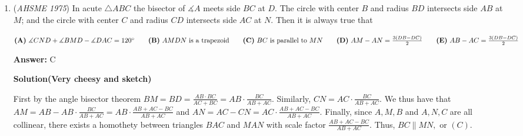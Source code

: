 \begin{enumerate}
 \textbf{Case 3:} Suppose the brother was the worst player and that him and the woman are twins. The woman and the best player are of opposite sex, so the best player would be the son. If the brother is the woman's twin (our initial assumption), then the son is not the same age as the brother, which means that the son is not the best player, and the brother is not the worst player.

 However, the woman and the brother do not necessarily have to be twins. For this case, we had to assume they were twins or else there was no way to continue the problem, since the brother would have no twin.

 \textbf{Case 4:} Suppose the son was the worst player. The daughter and the best player are of opposite sex, so the best player is the brother. The woman and her brother do not have to be twins. So it is, in fact, possible that the brother and the son are the same age.

 From this, we conclude our answer as $\boxed{\textbf{(B)}\ \text{her son}}$. ~\href{https://artofproblemsolving.com/wiki/index.php/User:Jiang147369}{jiang147369}

 


	\item (\textit{AHSME 1975}) In acute $\triangle ABC$ the bisector of $\measuredangle A$ meets side $BC$ at $D$. The circle with center $B$ and radius $BD$ 
intersects side $AB$ at $M$; and the circle with center $C$ and radius $CD$ intersects side $AC$ at $N$. Then it is always true that


 $\textbf{(A)}\ \measuredangle CND+\measuredangle BMD-\measuredangle DAC =120^{\circ} \qquad \textbf{(B)}\ AMDN\ \text{is a trapezoid}\qquad \textbf{(C)}\ BC\ \text{is parallel to}\ MN\\ \qquad \textbf{(D)}\ AM-AN=\frac{3(DB-DC)}{2}\qquad \textbf{(E)}\ AB-AC=\frac{3(DB-DC)}{2}$

 \textbf{Answer: }C



\textbf{Solution(Very cheesy and sketch)}

First by the angle bisector theorem $BM=BD=\frac{AB\cdot BC}{AC+BC}=AB\cdot \frac{BC}{AB+AC}.$ Similarly, $CN=AC\cdot \frac{BC}{AB+AC}.$ We thus have that $AM=AB-AB\cdot \frac{BC}{AB+AC}=AB\cdot \frac{AB+AC-BC}{AB+AC}$ and $AN=AC-CN=AC\cdot \frac{AB+AC-BC}{AB+AC}.$ Finally, since $A,M,B$ and $A,N,C$ are all collinear, there exists a homothety between triangles $BAC$ and $MAN$ with scale factor $\frac{AB+AC-BC}{AB+AC}.$ Thus, $BC\parallel MN,$ or $\boxed{(C)}.$


\end{enumerate}
